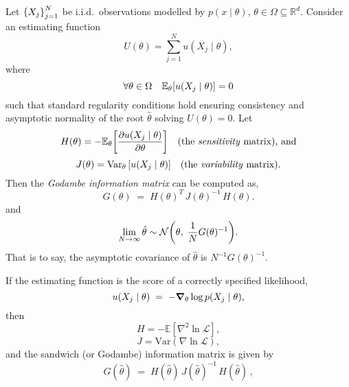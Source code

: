             \begin{theorem}
                Let \(\qty{X_j}_{j=1}^N\) be i.i.d.\ observations modelled by \(p(x\mid\theta)\), \(\theta\in\Omega\subseteq\mathbb{R}^{d}\).  Consider an estimating function
                \[
                    U(\theta) =\sum_{j=1}^{N}u(X_{j}\mid\theta),
                \]
                where 
                \[
                    \forall\theta\in\Omega\quad\mathbb{E}_{\theta}\qty[u(X_{j}\mid\theta)]=0
                \]
                such that standard regularity conditions hold ensuring consistency and asymptotic normality of the root \(\hat\theta\) solving \(U(\theta)=0\).  Let
                \[
                    H(\theta) =-\mathbb{E}_{\theta}\qty[\pdv{u(X_{j}\mid\theta)}{\theta}] \quad\text{(the \emph{sensitivity} matrix), and}
                \]
                \[
                    J(\theta) =\operatorname{Var}_{\theta}\qty[u(X_{j}\mid\theta)] \quad\text{(the \emph{variability} matrix).}
                \]
                Then the \emph{Godambe information matrix} can be computed as,
                \[
                    G(\theta) \;=\; H(\theta)^{T}\,J(\theta)^{-1}\,H(\theta).
                \]
                and
                \[
                \lim_{N\to\infty}\hat\theta \sim \mathcal{N}\qty(\theta,\;\frac1NG(\theta)^{-1}).
                \]
                That is to say, the asymptotic covariance of \(\hat\theta\) is \(N^{-1}G(\theta)^{-1}\).
            \end{theorem}
            \begin{corollary}
            If the estimating function is the score of a correctly specified likelihood,
            \[
                u(X_j\mid\theta)\;=\;-\grad_{\theta}\log p(X_j\mid\theta),
            \]
            then
            \[
                H = -\mathbb{E}[\nabla^2 \ln \mathcal{L}],
            \]
            \[
                J = \mathrm{Var}(\nabla \ln \mathcal{L}),
            \]
            and the sandwich (or Godambe) information matrix is given by
            \[
                G(\hat{\theta}) \;=\; H(\hat{\theta})\, J(\hat{\theta})^{-1}\, H(\hat{\theta}) \,,
            \]
            \end{corollary}
            
